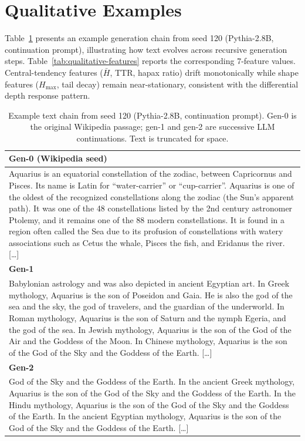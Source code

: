 \section{Qualitative Examples}
\label{app:qualitative}

Table~\ref{tab:qualitative-text} presents an example generation chain from seed 120 (Pythia-2.8B, continuation prompt), illustrating how text evolves across recursive generation steps.
Table~\ref{tab:qualitative-features} reports the corresponding 7-feature values. Central-tendency features ($\bar{H}$, TTR, hapax ratio) drift monotonically while shape features ($H_{\max}$, tail decay) remain near-stationary, consistent with the differential depth response pattern.

\begin{table}[t]
\centering
\caption{Example text chain from seed 120 (Pythia-2.8B, continuation prompt). Gen-0 is the original Wikipedia passage; gen-1 and gen-2 are successive LLM continuations. Text is truncated for space.}
\label{tab:qualitative-text}
\small
\begin{tabular}{p{}}
\toprule
\textbf{Gen-0 (Wikipedia seed)} \\
\midrule
Aquarius is an equatorial constellation of the zodiac, between Capricornus and Pisces. Its name is Latin for ``water-carrier'' or ``cup-carrier''. Aquarius is one of the oldest of the recognized constellations along the zodiac (the Sun's apparent path). It was one of the 48 constellations listed by the 2nd century astronomer Ptolemy, and it remains one of the 88 modern constellations. It is found in a region often called the Sea due to its profusion of constellations with watery associations such as Cetus the whale, Pisces the fish, and Eridanus the river. [\ldots] \\
\midrule
\textbf{Gen-1} \\
\midrule
Babylonian astrology and was also depicted in ancient Egyptian art. In Greek mythology, Aquarius is the son of Poseidon and Gaia. He is also the god of the sea and the sky, the god of travelers, and the guardian of the underworld. In Roman mythology, Aquarius is the son of Saturn and the nymph Egeria, and the god of the sea. In Jewish mythology, Aquarius is the son of the God of the Air and the Goddess of the Moon. In Chinese mythology, Aquarius is the son of the God of the Sky and the Goddess of the Earth. [\ldots] \\
\midrule
\textbf{Gen-2} \\
\midrule
God of the Sky and the Goddess of the Earth. In the ancient Greek mythology, Aquarius is the son of the God of the Sky and the Goddess of the Earth. In the Hindu mythology, Aquarius is the son of the God of the Sky and the Goddess of the Earth. In the ancient Egyptian mythology, Aquarius is the son of the God of the Sky and the Goddess of the Earth. [\ldots] \\
\bottomrule
\end{tabular}
\end{table}

